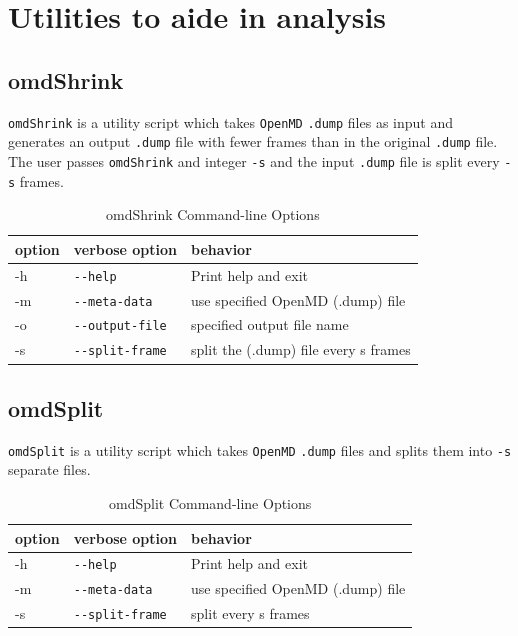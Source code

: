 \documentclass[]{book}
\begin{document}
\section{\label{section:utilities}Utilities to aide in analysis}

\subsection{\label{section:omdShrink}omdShrink}
{\tt omdShrink} is a utility script which takes {\tt OpenMD} {\tt .dump}
files as input and generates an output {\tt .dump} file with fewer frames
than in the original {\tt .dump} file. The user passes {\tt omdShrink}
and integer {\tt -s} and the input {\tt .dump} file is split every {\tt -s} 
frames.

\begin{longtable}[c]{|EFG|}
\caption{omdShrink Command-line Options}
\\ \hline
{\bf option} & {\bf verbose option} & {\bf behavior} \\ \hline
\endhead
\hline
\endfoot
  -h& {\tt -{}-help}               & Print help and exit\\
  -m& {\tt -{}-meta-data}          & use specified OpenMD (.dump) file \\
  -o& {\tt -{}-output-file}        & specified output file name \\
  -s& {\tt -{}-split-frame}        & split the (.dump) file every s frames \\
\end{longtable}

\subsection{\label{section:omdSplit}omdSplit}
{\tt omdSplit} is a utility script which takes {\tt OpenMD} {\tt .dump}
files and splits them into {\tt -s} separate files.

\begin{longtable}[c]{|EFG|}
\caption{omdSplit Command-line Options}
\\ \hline
{\bf option} & {\bf verbose option} & {\bf behavior} \\ \hline
\endhead
\hline
\endfoot
  -h& {\tt -{}-help}               & Print help and exit\\
  -m& {\tt -{}-meta-data}          & use specified OpenMD (.dump) file \\
  -s& {\tt -{}-split-frame}        & split every s frames \\
\end{longtable}
\end{document}
